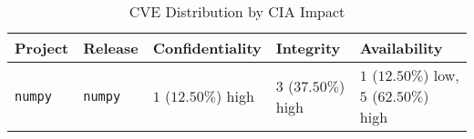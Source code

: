 \begin{table}
\caption{CVE Distribution by CIA Impact}
\label{tab:cve-cia-distribution}
\begin{tabular}{lllll}
\toprule
Project & Release & Confidentiality & Integrity & Availability \\
\midrule
\texttt{numpy} & \texttt{numpy} & $1$ ($12.50\%$) high & $3$ ($37.50\%$) high & $1$ ($12.50\%$) low, $5$ ($62.50\%$) high \\
\bottomrule
\end{tabular}
\end{table}
